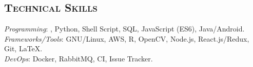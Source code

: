 \begin{resume}

\section{\textsc{Technical Skills}}

\emph{Programming}: \Cplusplus, Python, Shell Script, SQL, JavaScript (ES6),
Java/Android.\vspace{0.4em}\\
\emph{Frameworks/Tools}: GNU/Linux, AWS, R, OpenCV, Node.js, React.js/Redux,
Git, \LaTeX.\vspace{0.4em}\\
\emph{DevOps}: Docker, RabbitMQ, CI, Issue Tracker.

\end{resume}

